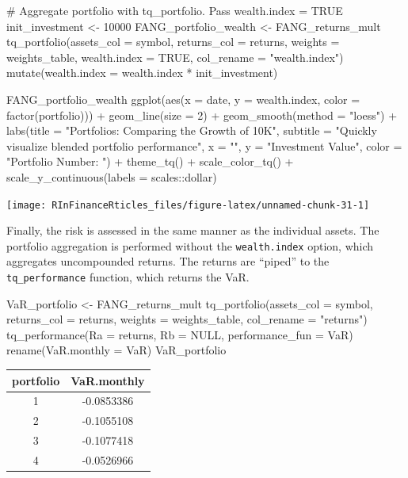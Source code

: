 \begin{Schunk}
\begin{Sinput}
# Aggregate portfolio with tq_portfolio. Pass wealth.index = TRUE
init_investment <- 10000
FANG_portfolio_wealth <- FANG_returns_mult %
    tq_portfolio(assets_col = symbol, returns_col = returns,
                 weights = weights_table, wealth.index = TRUE,
                 col_rename = "wealth.index") %
    mutate(wealth.index = wealth.index * init_investment)

FANG_portfolio_wealth  %
    ggplot(aes(x = date, y = wealth.index, color = factor(portfolio))) +
    geom_line(size = 2) +
    geom_smooth(method = "loess") +
    labs(title = "Portfolios: Comparing the Growth of 10K",
         subtitle = "Quickly visualize blended portfolio performance",
         x = "", y = "Investment Value",
         color = "Portfolio Number: ") +
    theme_tq() +
    scale_color_tq() +
    scale_y_continuous(labels = scales::dollar)
\end{Sinput}


\begin{center}\texttt{[image: RInFinanceRticles\_files/figure-latex/unnamed-chunk-31-1]} \end{center}

\end{Schunk}

Finally, the risk is assessed in the same manner as the individual
assets. The portfolio aggregation is performed without the
\texttt{wealth.index} option, which aggregates uncompounded returns. The
returns are ``piped'' to the \texttt{tq\_performance} function, which
returns the VaR.

\begin{Schunk}
\begin{Sinput}
VaR_portfolio <- FANG_returns_mult %
    tq_portfolio(assets_col = symbol, returns_col = returns,
                 weights = weights_table, col_rename = "returns") %
    tq_performance(Ra = returns, Rb = NULL, performance_fun = VaR) %
    rename(VaR.monthly = VaR)
VaR_portfolio
\end{Sinput}
\end{Schunk}

\begin{tabular}{cc}
\toprule
portfolio & VaR.monthly\\
\midrule
1 & -0.0853386\\
2 & -0.1055108\\
3 & -0.1077418\\
4 & -0.0526966\\
\bottomrule
\end{tabular}

